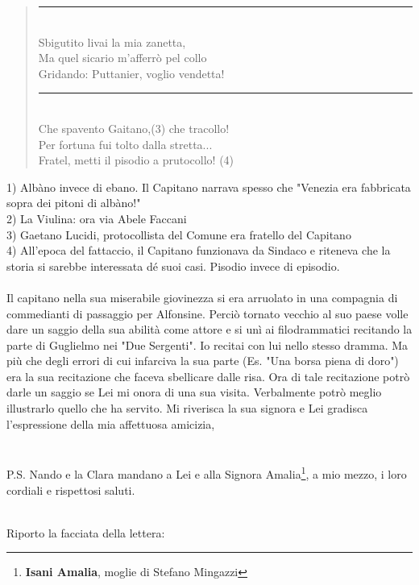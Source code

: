 {\begin{verse}
	\rule{1.5cm}{0.4pt}\\
	Sbigutito livai la mia zanetta,\\
	Ma quel sicario m'afferrò pel collo\\
	Gridando: Puttanier, voglio vendetta!\\
	\rule{1.5cm}{0.4pt}\\
	Che spavento Gaitano,(3) che tracollo!\\
	Per fortuna fui tolto dalla stretta...\\
	Fratel, metti il pisodio a prutocollo! (4)\\
\end{verse}
1) Albàno invece di ebano. Il Capitano narrava spesso che "Venezia era fabbricata sopra dei pitoni di albàno!"\\
2) La Viulina: ora via Abele Faccani\\
3) Gaetano Lucidi, protocollista del Comune era fratello del Capitano\\
4) All'epoca del fattaccio, il Capitano funzionava da Sindaco e riteneva che la storia si sarebbe interessata dé suoi casi. Pisodio invece di episodio. \\
\\
Il capitano nella sua miserabile giovinezza si era arruolato in una compagnia di commedianti di passaggio per Alfonsine. Perciò tornato vecchio al suo paese volle dare un saggio della sua abilità come attore e si unì ai filodrammatici recitando la parte di Guglielmo nei "Due Sergenti". Io recitai con lui nello stesso dramma. Ma più che degli errori di cui infarciva la sua parte (Es. "Una borsa piena di doro") era la sua recitazione che faceva sbellicare dalle risa. Ora di tale recitazione potrò darle un saggio se Lei mi onora di una sua visita. Verbalmente potrò meglio illustrarlo quello che ha servito. Mi riverisca la sua signora e Lei gradisca l'espressione della mia affettuosa amicizia,\\
\\\\P.S. Nando e la Clara mandano a Lei e alla Signora Amalia\footnote{\textbf{Isani Amalia}, moglie di Stefano Mingazzi}, a mio mezzo, i loro cordiali e rispettosi saluti.
}\\
\newpage
\noindent Riporto la facciata della lettera:\\
